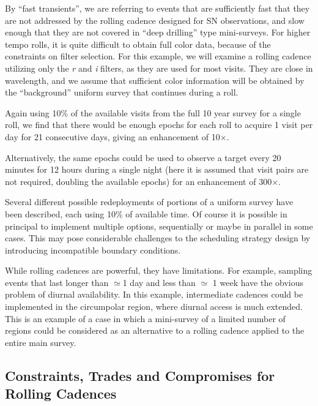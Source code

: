 By ``fast transients'', we are referring to events that are sufficiently
fast that they are not addressed by the rolling cadence designed for SN
observations, and slow enough that they are not covered in ``deep
drilling'' type mini-surveys.  For higher tempo rolls, it is quite
difficult to obtain full color data, because of the constraints on
filter selection.  For this example, we will examine a rolling cadence
utilizing only the {\it r} and {\it i} filters, as they are used for
most visits. They are close in wavelength, and we assume that sufficient
color information will be obtained by the ``background'' uniform survey
that continues during a roll.

Again using 10\% of the available visits from the full 10 year survey
for a single roll, we find that there would be enough epochs for each
roll to acquire 1 visit per day for 21 consecutive days, giving an
enhancement of 10$\times$.

Alternatively, the same epochs could be used to observe a target every
20 minutes for 12 hours during a single night (here it is assumed that
visit pairs are not required, doubling the available epochs) for an
enhancement of 300$\times$.

Several different possible redeployments of portions of a uniform survey
have been described, each using 10\% of available time.  Of course it is
possible in principal to implement multiple options, sequentially or
maybe in parallel in some cases. This may pose considerable challenges
to the scheduling strategy design by introducing incompatible boundary
conditions.

While rolling cadences are powerful, they have limitations.  For
example, sampling events that last longer than $\simeq$1 day and less
than $\simeq$ 1 week have the obvious problem of diurnal availability.
In this example, intermediate cadences could be implemented in the
circumpolar region, where diurnal access is much extended.  This is an
example of a case in which a mini-survey of a limited number of regions
could be considered as an alternative to a rolling cadence applied to
the entire main survey.



\subsection{Constraints, Trades and Compromises for Rolling Cadences}
\label{sec:rolling:trades}

